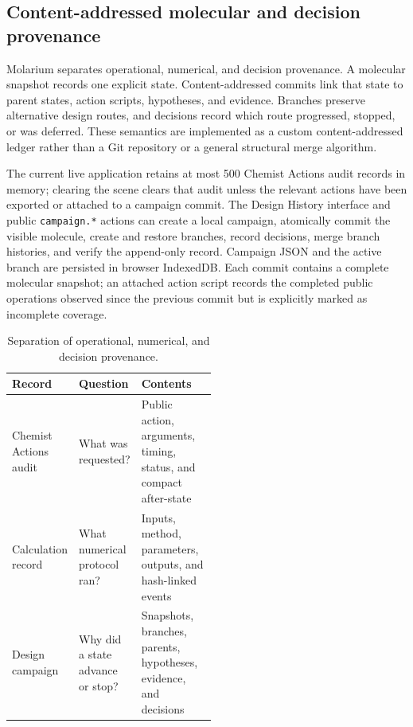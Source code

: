 \documentclass[11pt]{article}
\begin{document}
\begin{small}
\subsection{Content-addressed molecular and decision provenance}

Molarium separates operational, numerical, and decision provenance. A molecular snapshot records one explicit state. Content-addressed commits link that state to parent states, action scripts, hypotheses, and evidence. Branches preserve alternative design routes, and decisions record which route progressed, stopped, or was deferred. These semantics are implemented as a custom content-addressed ledger rather than a Git repository or a general structural merge algorithm.

The current live application retains at most 500 Chemist Actions audit records in memory; clearing the scene clears that audit unless the relevant actions have been exported or attached to a campaign commit. The Design History interface and public \texttt{campaign.*} actions can create a local campaign, atomically commit the visible molecule, create and restore branches, record decisions, merge branch histories, and verify the append-only record. Campaign JSON and the active branch are persisted in browser IndexedDB. Each commit contains a complete molecular snapshot; an attached action script records the completed public operations observed since the previous commit but is explicitly marked as incomplete coverage.

\begin{table}[htbp]
\centering\small
\caption{Separation of operational, numerical, and decision provenance.}
\label{tab:appA_provenance}
\begin{tabularx}{\linewidth}{@{}p{0.24\linewidth}p{0.27\linewidth}X@{}}
\toprule
\textbf{Record} & \textbf{Question} & \textbf{Contents}\\
\midrule
Chemist Actions audit & What was requested? & Public action, arguments, timing, status, and compact after-state\\
Calculation record & What numerical protocol ran? & Inputs, method, parameters, outputs, and hash-linked events\\
Design campaign & Why did a state advance or stop? & Snapshots, branches, parents, hypotheses, evidence, and decisions\\
\bottomrule
\end{tabularx}
\end{table}


\end{small}
\end{document}
